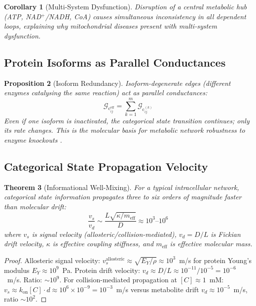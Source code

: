 \documentclass[10pt,twocolumn,a4paper]{article}
\theoremstyle{plain}
\newtheorem{theorem}{Theorem}[section]
\newtheorem{proposition}[theorem]{Proposition}
\newtheorem{corollary}[theorem]{Corollary}
\theoremstyle{definition}
\theoremstyle{remark}
\newcommand{\Gcond}{\mathcal{G}_{\mathrm{c}}}
\begin{document}
\begin{corollary}[Multi-System Dysfunction]
\label{cor:multisystem}
Disruption of a central metabolic hub (ATP, NAD$^+$/NADH, CoA) causes simultaneous inconsistency in all dependent loops, explaining why mitochondrial diseases present with multi-system dysfunction.
\end{corollary}

\subsection{Protein Isoforms as Parallel Conductances}

\begin{proposition}[Isoform Redundancy]
\label{prop:isoforms}
Isoform-degenerate edges (different enzymes catalysing the same reaction) act as parallel conductances:
\begin{equation}
    \Gcond_{ij}^{\mathrm{eff}} = \sum_{k=1}^m \Gcond_{ij}^{(k)}
\end{equation}
Even if one isoform is inactivated, the categorical state transition continues; only its rate changes. This is the molecular basis for metabolic network robustness to enzyme knockouts \citep{barabasi2004}.
\end{proposition}

\subsection{Categorical State Propagation Velocity}

\begin{theorem}[Informational Well-Mixing]
\label{thm:well_mixed}
For a typical intracellular network, categorical state information propagates three to six orders of magnitude faster than molecular drift:
\begin{equation}
    \frac{v_s}{v_d} \sim \frac{L\sqrt{\kappa/m_{\mathrm{eff}}}}{D} \approx 10^3\text{--}10^6
\end{equation}
where $v_s$ is signal velocity (allosteric/collision-mediated), $v_d = D/L$ is Fickian drift velocity, $\kappa$ is effective coupling stiffness, and $m_{\mathrm{eff}}$ is effective molecular mass.
\end{theorem}

\begin{proof}
Allosteric signal velocity: $v_s^{\mathrm{allosteric}} \approx \sqrt{E_Y/\rho} \approx 10^3$~m/s for protein Young's modulus $E_Y \approx 10^9$~Pa. Protein drift velocity: $v_d \approx D/L \approx 10^{-11}/10^{-5} = 10^{-6}$~m/s. Ratio: $\sim 10^9$. For collision-mediated propagation at $[C] \approx 1$~mM: $v_s \approx k_{\mathrm{on}}[C] \cdot d \approx 10^6 \times 10^{-9} = 10^{-3}$~m/s versus metabolite drift $v_d \approx 10^{-5}$~m/s, ratio $\sim 10^2$.
\end{proof}
\end{document}
